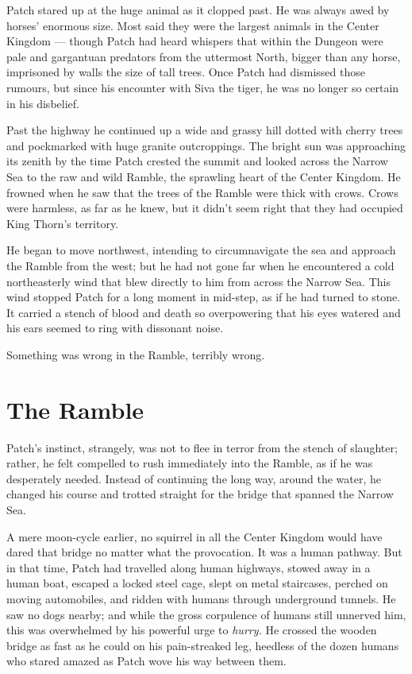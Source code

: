 \documentclass[ebook,oneside,openany,17pt]{memoir}
\newenvironment{tolerant}[1]{%
  \par\tolerance=#1\relax
}{%
  \par
}
\renewcommand{\thechapter}{\Roman{chapter}}
\newcounter{sections}
\newcommand{\sections}[1]{%
  \section*{#1}
  \addtocounter{sections}{1}%
  \pdfbookmark[1]{#1}{section.\thechapter.\thesections}}
\begin{document}
Patch stared up at the huge animal as it clopped past. He was always
awed by horses’ enormous size. Most said they were the largest animals
in the Center Kingdom — though Patch had heard whispers that within
the Dungeon were pale and gargantuan predators from the uttermost
North, bigger than any horse, imprisoned by walls the size of tall
trees. Once Patch had dismissed those rumours, but since his encounter
with Siva the tiger, he was no longer so certain in his disbelief.

Past the highway he continued up a wide and grassy hill dotted with
cherry trees and pockmarked with huge granite outcroppings. The bright
sun was approaching its zenith by the time Patch crested the summit
and looked across the Narrow Sea to the raw and wild Ramble, the
sprawling heart of the Center Kingdom. He frowned when he saw that the
trees of the Ramble were thick with crows. Crows were harmless, as far
as he knew, but it didn’t seem right that they had occupied King
Thorn’s territory.

He began to move northwest, intending to circumnavigate the sea and
approach the Ramble from the west; but he had not gone far when he
encountered a cold northeasterly wind that blew directly to him from
across the Narrow Sea. This wind stopped Patch for a long moment in
mid-step, as if he had turned to stone. It carried a stench of blood
and death so overpowering that his eyes watered and his ears seemed to
ring with dissonant noise.

\begin{tolerant}{1000}
Something was wrong in the Ramble, terribly wrong.
\end{tolerant}


\sections{The Ramble}

Patch’s instinct, strangely, was not to flee in terror from the stench
of slaughter; rather, he felt compelled to rush immediately into the
Ramble, as if he was desperately needed. Instead of continuing the
long way, around the water, he changed his course and trotted straight
for the bridge that spanned the Narrow Sea.

A mere moon-cycle earlier, no squirrel in all the Center Kingdom would
have dared that bridge no matter what the provocation. It was a human
pathway. But in that time, Patch had travelled along human highways,
stowed away in a human boat, escaped a locked steel cage, slept on
metal staircases, perched on moving automobiles, and ridden with
humans through underground tunnels. He saw no dogs nearby; and while
the gross corpulence of humans still unnerved him, this was
overwhelmed by his powerful urge to \emph{hurry.} He crossed the
wooden bridge as fast as he could on his pain-streaked leg, heedless
of the dozen humans who stared amazed as Patch wove his way between
them.
\end{document}
